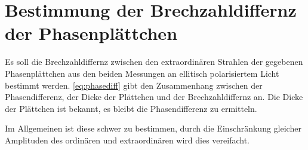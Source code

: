 \chapter{Bestimmung der Brechzahldiffernz der Phasenplättchen}

Es soll die Brechzahldiffernz zwischen den extraordinären Strahlen der gegebenen Phasenplättchen aus den beiden Messungen an ellitisch polarisiertem Licht bestimmt werden.
\autoref{eq:phasediff} gibt den Zusammenhang zwischen der Phasendifferenz, der Dicke der Plättchen und der Brechzahldiffernz an.
Die Dicke der Plättchen ist bekannt, es bleibt die Phasendifferenz zu ermitteln.

Im Allgemeinen ist diese schwer zu bestimmen, durch die Einschränkung gleicher Amplituden des ordinären und extraordinären wird dies vereifacht.